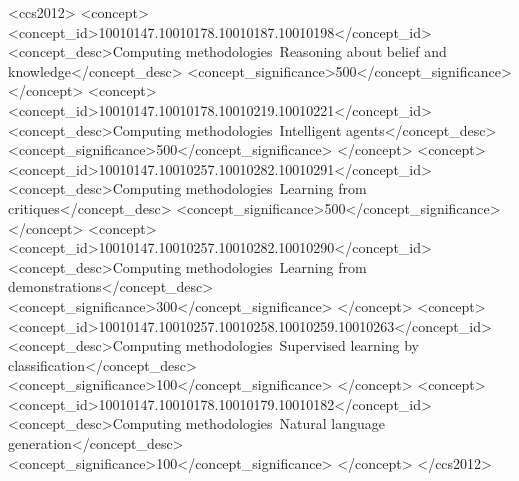 \documentclass[sigconf]{acmart}
\begin{document}
\begin{CCSXML}
<ccs2012>
   <concept>
       <concept_id>10010147.10010178.10010187.10010198</concept_id>
       <concept_desc>Computing methodologies~Reasoning about belief and knowledge</concept_desc>
       <concept_significance>500</concept_significance>
       </concept>
   <concept>
       <concept_id>10010147.10010178.10010219.10010221</concept_id>
       <concept_desc>Computing methodologies~Intelligent agents</concept_desc>
       <concept_significance>500</concept_significance>
       </concept>
   <concept>
       <concept_id>10010147.10010257.10010282.10010291</concept_id>
       <concept_desc>Computing methodologies~Learning from critiques</concept_desc>
       <concept_significance>500</concept_significance>
       </concept>
   <concept>
       <concept_id>10010147.10010257.10010282.10010290</concept_id>
       <concept_desc>Computing methodologies~Learning from demonstrations</concept_desc>
       <concept_significance>300</concept_significance>
       </concept>
   <concept>
       <concept_id>10010147.10010257.10010258.10010259.10010263</concept_id>
       <concept_desc>Computing methodologies~Supervised learning by classification</concept_desc>
       <concept_significance>100</concept_significance>
       </concept>
   <concept>
       <concept_id>10010147.10010178.10010179.10010182</concept_id>
       <concept_desc>Computing methodologies~Natural language generation</concept_desc>
       <concept_significance>100</concept_significance>
       </concept>
 </ccs2012>
\end{CCSXML}




\maketitle














\end{document}
